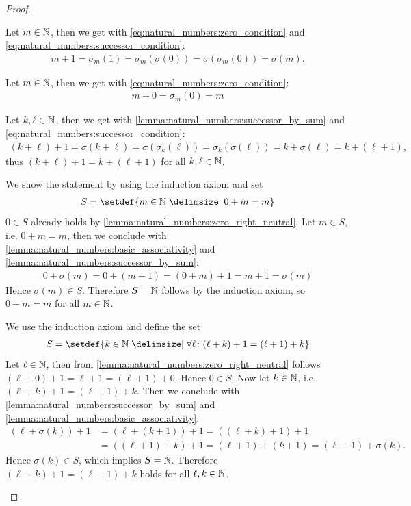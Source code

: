 \begin{proof}
    \begin{proofenumerate}
        \item Let $m\in\mathbb{N}$, then we get with \eqref{eq:natural_numbers:zero_condition} and \eqref{eq:natural_numbers:successor_condition}:
        \begin{align}m+1=\sigma_m(1)=\sigma_m(\sigma(0))=\sigma(\sigma_m(0))=\sigma(m).\end{align}

        \item Let $m\in\mathbb{N}$, then we get with \eqref{eq:natural_numbers:zero_condition}:
        \begin{align}m+0=\sigma_m(0)=m\end{align}

        \item Let $k,\ell\in\mathbb{N}$, then we get with \ref{lemma:natural_numbers:successor_by_sum} and \eqref{eq:natural_numbers:successor_condition}:
        \begin{align}(k+\ell)+1=\sigma(k+\ell)=\sigma(\sigma_k(\ell))=\sigma_k(\sigma(\ell))=k+\sigma(\ell)=k+(\ell+1),\end{align}
        thus $(k+\ell)+1=k+(\ell+1)$ for all $k,\ell\in\mathbb{N}$.

        \item We show the statement by using the induction axiom and set
        \begin{align}S=\setdef{m\in\setN\given 0+m=m}\end{align}
        $0\in S$ already holds by \ref{lemma:natural_numbers:zero_right_neutral}. Let $m\in S$, i.e. $0+m=m$, then we conclude with \ref{lemma:natural_numbers:basic_associativity} and \ref{lemma:natural_numbers:successor_by_sum}:
        \begin{align}0+\sigma(m)=0+(m+1)=(0+m)+1=m+1=\sigma(m)\end{align}
        Hence $\sigma(m)\in S$. Therefore $S=\mathbb{N}$ follows by the induction axiom, so $0+m=m$ for all $m\in\mathbb{N}$.

        \item We use the induction axiom and define the set
        \begin{align}S=\setdef{k\in\setN\given \forall \ell\colon (\ell+k)+1=(\ell+1)+k}\end{align}
        Let $\ell\in\mathbb{N}$, then from \ref{lemma:natural_numbers:zero_right_neutral} follows $(\ell+0)+1=\ell+1=(\ell+1)+0$. Hence $0\in S$. Now let $k\in\mathbb{N}$, i.e. $(\ell+k)+1=(\ell+1)+k$. Then we conclude with \ref{lemma:natural_numbers:successor_by_sum} and \ref{lemma:natural_numbers:basic_associativity}:
        \begin{align}
        (\ell+\sigma(k))+1&=(\ell+(k+1))+1=((\ell+k)+1)+1\\
        &=((\ell+1)+k)+1=(\ell+1)+(k+1)=(\ell+1)+\sigma(k).
        \end{align}
        Hence $\sigma(k)\in S$, which implies $S=\mathbb{N}$. Therefore $(\ell+k)+1=(\ell+1)+k$ holds for all $\ell,k\in\mathbb{N}$.
    \end{proofenumerate}
\end{proof}

